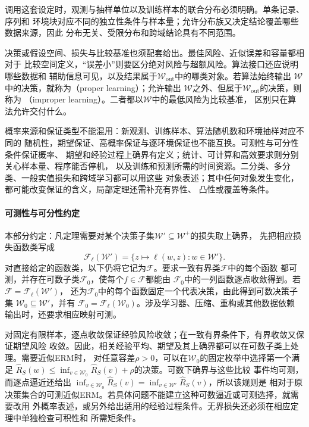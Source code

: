 调用这套设定时，观测与抽样单位以及训练样本的联合分布必须明确。单条记录、序列和
环境块对应不同的独立性条件与样本量；允许分布族又决定结论覆盖哪些数据来源，因此
分布无关、受限分布和跨域结论具有不同范围。

决策或假设空间、损失与比较基准也须配套给出。最佳风险、近似误差和容量都相对于
比较空间定义，“误差小”则要区分绝对风险与超额风险。算法接口还应说明哪些数据和
辅助信息可见，以及结果属于$\mathcal W_{\mathrm{out}}$中的哪类对象。若算法始终输出
$\mathcal W$中的决策，就称为（proper learning）；允许输出
$\mathcal W$之外、但属于$\mathcal W_{\mathrm{out}}$的决策，则称为
（improper learning）。二者都以$\mathcal W$中的最低风险为比较基准，
区别只在算法允许交付什么。

概率来源和保证类型不能混用：新观测、训练样本、算法随机数和环境抽样对应不同的
随机性，期望保证、高概率保证与逐环境保证也不能互换。可测性与可分性条件保证概率、
期望和经验过程上确界有定义；统计、可计算和高效要求则分别关心样本量、程序能否停机，
以及训练和预测所需的时间资源。二分类、多分类、一般实值损失和跨域学习都可以用这些
对象表述；其中任何对象发生变化，都可能改变保证的含义，局部定理还需补充有界性、
凸性或覆盖等条件。

\paragraph{可测性与可分性约定}

本部分约定：凡定理需要对某个决策子集$\mathcal W'\subseteq\mathcal W^+$的损失取上确界，
先把相应损失函数类写成
\[
 \mathcal F_\ell(\mathcal W')
 =\{z\mapsto\ell(w,z):w\in\mathcal W'\}.
\]
对直接给定的函数类，以下仍将它记为$\mathcal F$。要求一致有界类$\mathcal F$中的每个函数
都可测，并存在可数子类$\mathcal F_0$，使每个$f\in\mathcal F$都能由
$\mathcal F_0$中的一列函数逐点收敛得到。若$\mathcal F=\mathcal F_\ell(\mathcal W')$，
还为$\mathcal F_0$中的每个函数固定一个代表决策，由此得到可数决策子集
$\mathcal W_0\subseteq\mathcal W'$，并有
$\mathcal F_0=\mathcal F_\ell(\mathcal W_0)$。涉及学习器、压缩、重构或其他数据依赖
输出时，还要求相应映射可测。

对固定有限样本，逐点收敛保证经验风险收敛；在一致有界条件下，有界收敛又保证期望风险
收敛。因此，相关经验平均、期望及其上确界都可以在可数子类上处理。需要近似ERM时，
对任意容差$\rho>0$，可以在$\mathcal W_0$的固定枚举中选择第一个满足
$\hat R_S(w)\leq\inf_{v\in\mathcal W_0}\hat R_S(v)+\rho$的决策。可数下确界与这些比较
事件均可测，而逐点逼近还给出
$\inf_{v\in\mathcal W_0}\hat R_S(v)=\inf_{v\in\mathcal W'}\hat R_S(v)$，所以该规则是
相对于原决策集合的可测近似ERM。若具体问题不能建立这种可数逼近或可测选择，就需要改用
外概率表述，或另外给出适用的经验过程条件。无界损失还必须在相应定理中单独检查可积性和
所需矩条件。

